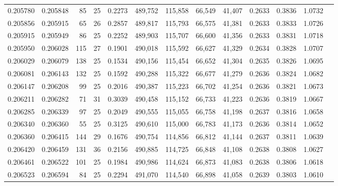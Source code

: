 \begin{tabular}{rrrrrrrrrrrrr}
0.205780 & 0.205848 &  85 &  25 &                                     0.2273 & 489,752 & 115,858 &  66,549 &  41,407 & 0.2633 & 0.3836 & 1.0732 \\
0.205856 & 0.205915 &  65 &  26 &                                     0.2857 & 489,817 & 115,793 &  66,575 &  41,381 & 0.2633 & 0.3833 & 1.0726 \\
0.205915 & 0.205949 &  86 &  25 &                                     0.2252 & 489,903 & 115,707 &  66,600 &  41,356 & 0.2633 & 0.3831 & 1.0718 \\
0.205950 & 0.206028 & 115 &  27 &                                     0.1901 & 490,018 & 115,592 &  66,627 &  41,329 & 0.2634 & 0.3828 & 1.0707 \\
0.206029 & 0.206079 & 138 &  25 &                                     0.1534 & 490,156 & 115,454 &  66,652 &  41,304 & 0.2635 & 0.3826 & 1.0695 \\
0.206081 & 0.206143 & 132 &  25 &                                     0.1592 & 490,288 & 115,322 &  66,677 &  41,279 & 0.2636 & 0.3824 & 1.0682 \\
0.206147 & 0.206208 &  99 &  25 &                                     0.2016 & 490,387 & 115,223 &  66,702 &  41,254 & 0.2636 & 0.3821 & 1.0673 \\
0.206211 & 0.206282 &  71 &  31 &                                     0.3039 & 490,458 & 115,152 &  66,733 &  41,223 & 0.2636 & 0.3819 & 1.0667 \\
0.206285 & 0.206339 &  97 &  25 &                                     0.2049 & 490,555 & 115,055 &  66,758 &  41,198 & 0.2637 & 0.3816 & 1.0658 \\
0.206340 & 0.206360 &  55 &  25 &                                     0.3125 & 490,610 & 115,000 &  66,783 &  41,173 & 0.2636 & 0.3814 & 1.0652 \\
0.206360 & 0.206415 & 144 &  29 &                                     0.1676 & 490,754 & 114,856 &  66,812 &  41,144 & 0.2637 & 0.3811 & 1.0639 \\
0.206420 & 0.206459 & 131 &  36 &                                     0.2156 & 490,885 & 114,725 &  66,848 &  41,108 & 0.2638 & 0.3808 & 1.0627 \\
0.206461 & 0.206522 & 101 &  25 &                                     0.1984 & 490,986 & 114,624 &  66,873 &  41,083 & 0.2638 & 0.3806 & 1.0618 \\
0.206523 & 0.206594 &  84 &  25 &                                     0.2294 & 491,070 & 114,540 &  66,898 &  41,058 & 0.2639 & 0.3803 & 1.0610 \\

\end{tabular}
